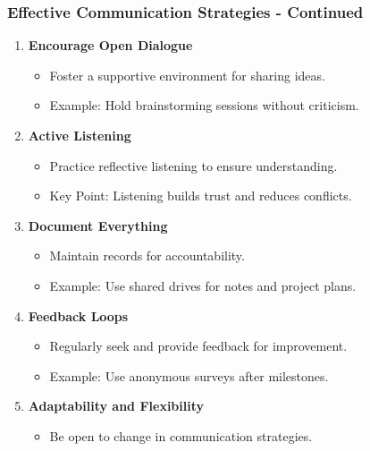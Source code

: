 \documentclass{beamer}
\begin{document}
\begin{frame}[fragile]
    \frametitle{Effective Communication Strategies - Continued}
    \begin{enumerate}[resume]
        \item \textbf{Encourage Open Dialogue}
            \begin{itemize}
                \item Foster a supportive environment for sharing ideas.
                \item Example: Hold brainstorming sessions without criticism.
            \end{itemize}

        \item \textbf{Active Listening}
            \begin{itemize}
                \item Practice reflective listening to ensure understanding.
                \item Key Point: Listening builds trust and reduces conflicts.
            \end{itemize}

        \item \textbf{Document Everything}
            \begin{itemize}
                \item Maintain records for accountability.
                \item Example: Use shared drives for notes and project plans.
            \end{itemize}

        \item \textbf{Feedback Loops}
            \begin{itemize}
                \item Regularly seek and provide feedback for improvement.
                \item Example: Use anonymous surveys after milestones.
            \end{itemize}

        \item \textbf{Adaptability and Flexibility}
            \begin{itemize}
                \item Be open to change in communication strategies.
            \end{itemize}
    \end{enumerate}
\end{frame}
\end{document}
